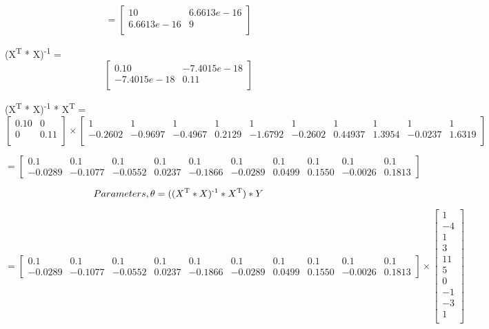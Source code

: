 \documentclass{report}
\begin{document}
\begin{flushleft}
\[=
\begin{bmatrix}
10	& 6.6613e-16 \\
6.6613e-16 & 9 \\
\end{bmatrix}
\] \linebreak[2]

(X\textsuperscript{T} * X)\textsuperscript{-1} =
 \[
\begin{bmatrix}
0.10 & -7.4015e-18 \\
-7.4015e-18 & 0.11 \\
\end{bmatrix}
\]

(X\textsuperscript{T} * X)\textsuperscript{-1} * X\textsuperscript{T} =
 \[
\begin{bmatrix}
0.10 & 0 \\
0 & 0.11 \\
\end{bmatrix}
\times
\begin{bmatrix}
1 & 
1 & 
1 & 
1 & 
1 & 
1 & 
1 & 
1 & 
1 & 
1 \\
-0.2602 &
-0.9697 &
-0.4967 &
0.2129 &
-1.6792 &
-0.2602 &
0.44937 &
1.3954 &
-0.0237 &
1.6319 \\
\end{bmatrix}
\]

\[=
\begin{bmatrix}
0.1 & 0.1 & 0.1 & 0.1 & 0.1 & 0.1 & 0.1 & 0.1 & 0.1 & 0.1 \\
-0.0289 & -0.1077 & -0.0552 & 0.0237 & -0.1866 & -0.0289 & 0.0499 & 0.1550 & -0.0026 &	0.1813
\end{bmatrix}
\] \linebreak[2]

\begin{equation}
Parameters, \theta = ((X\textsuperscript{T} * X)\textsuperscript{-1} * X\textsuperscript{T}) * Y
\end{equation}

\[=
\begin{bmatrix}
0.1 & 0.1 & 0.1 & 0.1 & 0.1 & 0.1 & 0.1 & 0.1 & 0.1 & 0.1 \\
-0.0289 & -0.1077 & -0.0552 & 0.0237 & -0.1866 & -0.0289 & 0.0499 & 0.1550 & -0.0026 &	0.1813
\end{bmatrix}
\times
\begin{bmatrix}
1 \\
-4 \\
1 \\
3 \\
11 \\
5 \\
0 \\
-1 \\
-3 \\
1 \\
\end{bmatrix}
\]


\end{flushleft}
\end{document}
